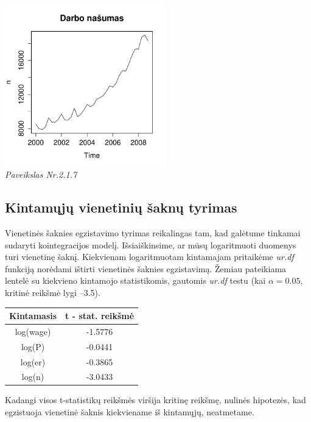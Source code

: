 \documentclass[12pt,a4paper]{article}
\theoremstyle{change}\newtheorem{salyga}{Uždavinys}
\begin{document}
\begin{center}
\includegraphics[width=70mm,height=70mm]{nn}
\\
\textit{Paveikslas Nr.2.1.7}
\end{center}
\vskip 8pt








\subsection{Kintamųjų vienetinių šaknų tyrimas}
\medskip


\hspace{40pt}Vienetinės šaknies egzistavimo tyrimas reikalingas tam, kad galėtume tinkamai sudaryti kointegracijos modelį. Išsiaiškinsime, ar mūsų logaritmuoti duomenys turi vienetinę šaknį. Kiekvienam logaritmuotam kintamajam pritaikėme \textit{ur.df} funkciją norėdami ištirti vienetinės šaknies egzistavimą. Žemiau pateikiama lentelė su kiekvieno kintamojo statistikomis, gautomis \textit{ur.df} testu (kai $\alpha =0.05 $, kritinė reikšmė lygi –3.5).

\vskip 15pt

\begin{center}
\begin{tabular}{|c|c|}
\hline\textbf{ Kintamasis} &\textbf{ t - stat. reikšmė }\\ 
\hline log(wage) & -1.5776 \\ 
\hline log(P) & -0.0441 \\ 
\hline log(er) & -0.3865 \\ 
\hline log(n) & -3.0433 \\ 
\hline 
\end{tabular} 
\end{center}
Kadangi visos t-statistikų reikšmės viršija kritinę reikšmę, nulinės hipotezės, kad egzistuoja vienetinė šaknis kiekviename iš kintamųjų, neatmetame. 
\end{document}
